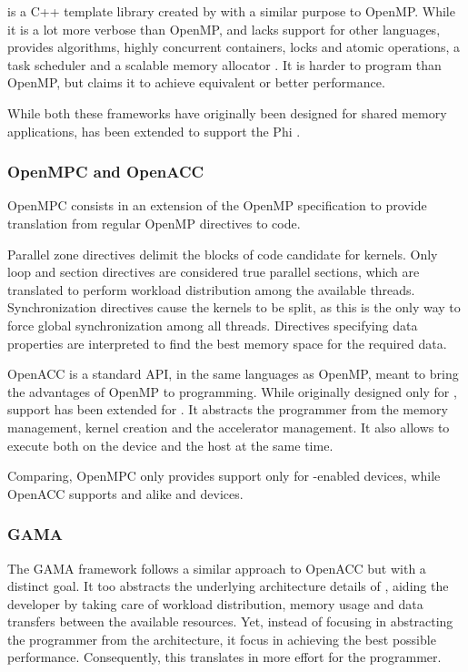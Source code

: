 \tbb is a C++ template library created by \intel with a similar purpose to OpenMP. While it is a lot more verbose than OpenMP, and lacks support for other languages, \tbb provides algorithms, highly concurrent containers, locks and atomic operations, a task scheduler and a scalable memory allocator \cite{TBB}. It is harder to program than OpenMP, but \intel claims it to achieve equivalent or better performance.

While both these frameworks have originally been designed for shared memory applications, \tbb has been extended to support the \xeon Phi \cite{Intel:XeonPhi:QuickStartGuide}.

\subsubsection{OpenMPC and OpenACC}
OpenMPC\cite{OpenMPC} consists in an extension of the OpenMP specification to provide translation from  regular OpenMP directives to \cuda code.

Parallel zone directives delimit the blocks of code candidate for \cuda kernels. Only loop and section directives are considered true parallel sections, which are translated to perform workload distribution among the available threads. Synchronization directives cause the kernels to be split, as this is the only way to force global synchronization among all threads. Directives specifying data properties are interpreted to find the best \gpu memory space for the required data.

OpenACC\cite{OpenACC:1.0} is a standard API, in the same languages as OpenMP, meant to bring the advantages of OpenMP to \gpu programming. While originally designed only for \gpus, support has been extended for \mics. It abstracts the programmer from the memory management, kernel creation and the accelerator management. It also allows to execute both on the device and the \gpu host at the same time.


Comparing, OpenMPC only provides support only for \cuda-enabled devices, while OpenACC supports \nvidia and \amd\gpus alike and \intel\mic devices.

\subsubsection{GAMA}
The \ac{GAMA} framework follows a similar approach to OpenACC but with a distinct goal. It too abstracts the underlying architecture details of \hetplats, aiding the developer by taking care of workload distribution, memory usage and data transfers between the available resources. Yet, instead of focusing in abstracting the programmer from the architecture, it focus in achieving the best possible performance. Consequently, this translates in more effort for the programmer.
